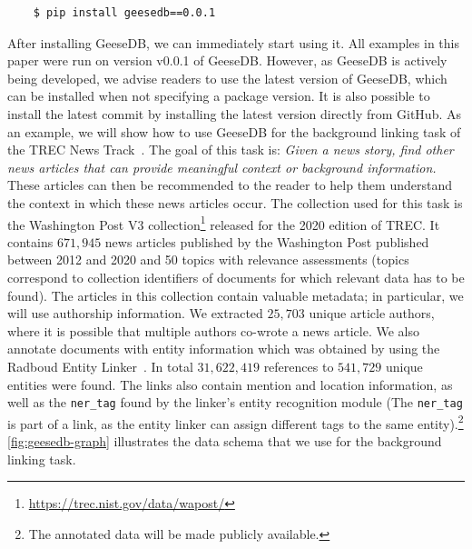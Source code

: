 \begin{verbatim}
	$ pip install geesedb==0.0.1
\end{verbatim}
After installing GeeseDB, we can immediately start using it. All examples in this paper were run on version v0.0.1 of GeeseDB. However, as GeeseDB is actively being developed, we advise readers to use the latest version of GeeseDB, which can be installed when not specifying a package version. It is also possible to install the latest commit by installing the latest version directly from GitHub.
As an example, we will show how to use GeeseDB for the background linking task of the TREC News Track~\citep{soboroff2018trec}. The goal of this task is: \textit{Given a news story, find other news articles that can provide meaningful context or background information.} These articles can then be recommended to the reader to help them understand the context in which these news articles occur. The collection used for this task is the Washington Post V3 collection\footnote{\url{https://trec.nist.gov/data/wapost/}} released for the 2020 edition of TREC. It contains $671,945$ news articles published by the Washington Post published between 2012 and 2020 and 50 topics with relevance assessments (topics correspond to collection identifiers of documents for which relevant data has to be found). The articles in this collection contain valuable metadata; in particular, we will use authorship information. We extracted $25,703$ unique article authors, where it is possible that multiple authors co-wrote a news article. We also annotate documents with entity information which was obtained by using the Radboud Entity Linker~\citep{REL}. In total $31,622,419$ references to $541,729$ unique entities were found. The links also contain mention and location information, as well as the \texttt{ner\_tag} found by the linker's entity recognition module (The \texttt{ner\_tag} is part of a link, as the entity linker can assign different tags to the same entity).\footnote{The annotated data will be made publicly available.} \cref{fig:geesedb-graph} illustrates the data schema that we use for the background linking task. 

